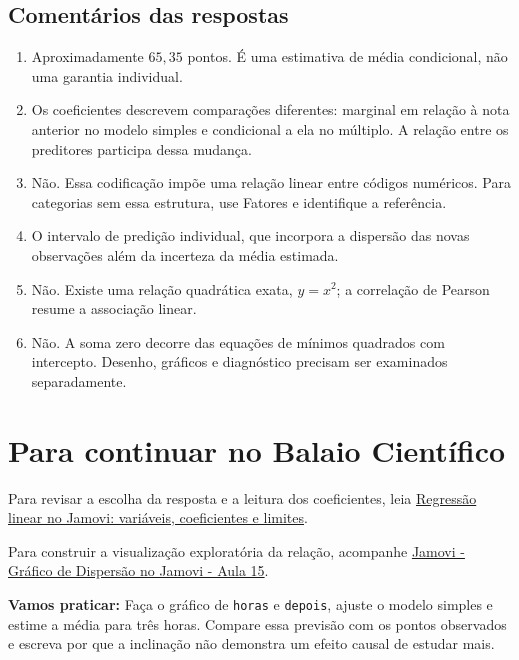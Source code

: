 \subsection*{Comentários das respostas}

\begin{enumerate}
  \item Aproximadamente $65{,}35$ pontos. É uma estimativa de média condicional, não uma garantia individual.
  \item Os coeficientes descrevem comparações diferentes: marginal em relação à nota anterior no modelo simples e condicional a ela no múltiplo. A relação entre os preditores participa dessa mudança.
  \item Não. Essa codificação impõe uma relação linear entre códigos numéricos. Para categorias sem essa estrutura, use Fatores e identifique a referência.
  \item O intervalo de predição individual, que incorpora a dispersão das novas observações além da incerteza da média estimada.
  \item Não. Existe uma relação quadrática exata, $y=x^2$; a correlação de Pearson resume a associação linear.
  \item Não. A soma zero decorre das equações de mínimos quadrados com intercepto. Desenho, gráficos e diagnóstico precisam ser examinados separadamente.
\end{enumerate}

\section{Para continuar no Balaio Científico}

Para revisar a escolha da resposta e a leitura dos coeficientes, leia \href{https://www.balaiocientifico.com/2026/10/regressao-linear-no-jamovi-variaveis.html}{Regressão linear no Jamovi: variáveis, coeficientes e limites}.

Para construir a visualização exploratória da relação, acompanhe \href{https://www.youtube.com/watch?v=K507gYOjBMA}{Jamovi - Gráfico de Dispersão no Jamovi - Aula 15}.

\textbf{Vamos praticar:} Faça o gráfico de \texttt{horas} e \texttt{depois}, ajuste o modelo simples e estime a média para três horas. Compare essa previsão com os pontos observados e escreva por que a inclinação não demonstra um efeito causal de estudar mais.
